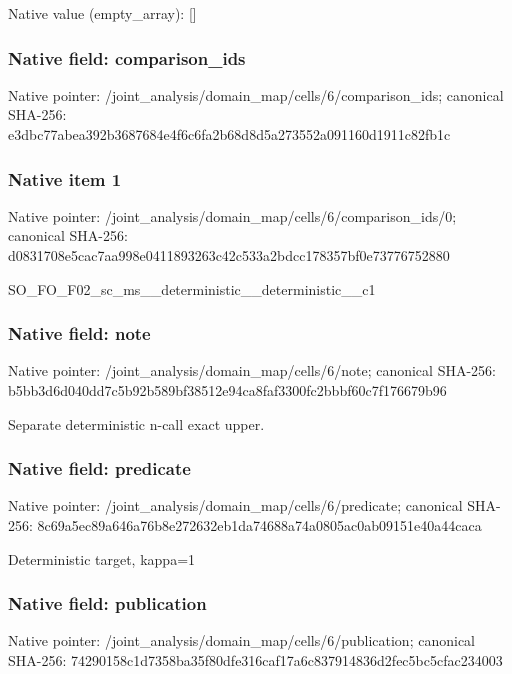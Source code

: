 \documentclass[10pt,a4paper]{article}
\begin{document}
Native value (empty\_\allowbreak{}array): []

\subsubsection{Native field: comparison\_\allowbreak{}ids}
Native pointer: /joint\_\allowbreak{}analysis/domain\_\allowbreak{}map/cells/6/comparison\_\allowbreak{}ids; canonical SHA-256: e3dbc77abea392b3687684e4f6c6fa2b68d8d5a273552a091160d1911c82fb1c

\subsubsection{Native item 1}
Native pointer: /joint\_\allowbreak{}analysis/domain\_\allowbreak{}map/cells/6/comparison\_\allowbreak{}ids/0; canonical SHA-256: d0831708e5cac7aa998e0411893263c42c533a2bdcc178357bf0e73776752880

\begingroup\raggedright\sloppy SO\_\allowbreak{}FO\_\allowbreak{}F02\_\allowbreak{}sc\_\allowbreak{}ms\_\allowbreak{}\_\allowbreak{}deterministic\_\allowbreak{}\_\allowbreak{}deterministic\_\allowbreak{}\_\allowbreak{}c1\par\endgroup

\subsubsection{Native field: note}
Native pointer: /joint\_\allowbreak{}analysis/domain\_\allowbreak{}map/cells/6/note; canonical SHA-256: b5bb3d6d040dd7c5b92b589bf38512e94ca8faf3300fc2bbbf60c7f176679b96

\begingroup\raggedright\sloppy Separate deterministic n-call exact upper.\par\endgroup

\subsubsection{Native field: predicate}
Native pointer: /joint\_\allowbreak{}analysis/domain\_\allowbreak{}map/cells/6/predicate; canonical SHA-256: 8c69a5ec89a646a76b8e272632eb1da74688a74a0805ac0ab09151e40a44caca

\begingroup\raggedright\sloppy Deterministic target,\allowbreak{} kappa=\allowbreak{}1\par\endgroup

\subsubsection{Native field: publication}
Native pointer: /joint\_\allowbreak{}analysis/domain\_\allowbreak{}map/cells/6/publication; canonical SHA-256: 74290158c1d7358ba35f80dfe316caf17a6c837914836d2fec5bc5cfac234003
\end{document}
